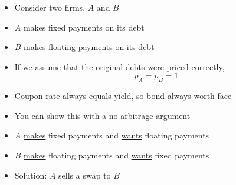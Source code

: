 \begin{frame}{}
    \begin{itemize}
        \item Consider two firms, $A$ and $B$
        \item $A$ makes fixed payments on its debt
        \item $B$ makes floating payments on its debt
    \end{itemize}
\begin{center}
\end{center}
\end{frame}

\begin{frame}{}
    \begin{itemize}
        \item If we assume that the original debts were priced correctly, 
            \begin{equation}
                p_{A}=p_{B}=1
            \end{equation}
        \item Coupon rate always equals yield, so bond always worth face
        \item You can show this with a no-arbitrage argument
    \end{itemize}
\end{frame}

\begin{frame}{}
    \begin{itemize}
        \item $A$ \underline{makes} fixed payments and \underline{wants} floating payments
        \item $B$ \underline{makes} floating payments and \underline{wants} fixed payments
        \item Solution: $A$ sells a swap to $B$ 
    \end{itemize}
\end{frame}

